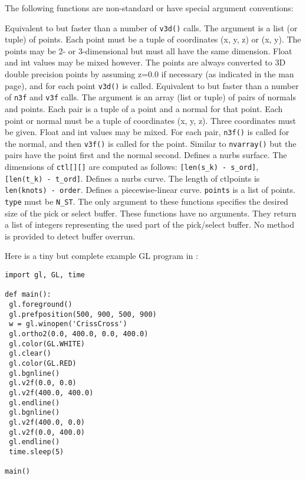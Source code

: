 The following functions are non-standard or have special argument
conventions:
\begin{description}
Equivalent to but faster than a number of
{\tt v3d()}
calls.
The argument is a list (or tuple) of points.
Each point must be a tuple of coordinates (x, y, z) or (x, y).
The points may be 2- or 3-dimensional but must all have the
same dimension.
Float and int values may be mixed however.
The points are always converted to 3D double precision points
by assuming z=0.0 if necessary (as indicated in the man page),
and for each point
{\tt v3d()}
is called.
Equivalent to but faster than a number of
{\tt n3f}
and
{\tt v3f}
calls.
The argument is an array (list or tuple) of pairs of normals and points.
Each pair is a tuple of a point and a normal for that point.
Each point or normal must be a tuple of coordinates (x, y, z).
Three coordinates must be given.
Float and int values may be mixed.
For each pair,
{\tt n3f()}
is called for the normal, and then
{\tt v3f()}
is called for the point.
Similar to
{\tt nvarray()}
but the pairs have the point first and the normal second.
\itembreak
Defines a nurbs surface.
The dimensions of
{\tt ctl[][]}
are computed as follows:
{\tt [len(s\_k)~-~s\_ord]},
{\tt [len(t\_k)~-~t\_ord]}.
Defines a nurbs curve.
The length of ctlpoints is
{\tt len(knots)~-~order}.
Defines a piecewise-linear curve.
{\tt points}
is a list of points.
{\tt type}
must be
{\tt N\_ST}.
The only argument to these functions specifies the desired size of the
pick or select buffer.
These functions have no arguments.
They return a list of integers representing the used part of the
pick/select buffer.
No method is provided to detect buffer overrun.
\end{description}

Here is a tiny but complete example GL program in {\Python}:
\bcode\begin{verbatim}
import gl, GL, time

def main():
 gl.foreground()
 gl.prefposition(500, 900, 500, 900)
 w = gl.winopen('CrissCross')
 gl.ortho2(0.0, 400.0, 0.0, 400.0)
 gl.color(GL.WHITE)
 gl.clear()
 gl.color(GL.RED)
 gl.bgnline()
 gl.v2f(0.0, 0.0)
 gl.v2f(400.0, 400.0)
 gl.endline()
 gl.bgnline()
 gl.v2f(400.0, 0.0)
 gl.v2f(0.0, 400.0)
 gl.endline()
 time.sleep(5)

main()
\end{verbatim}\ecode

